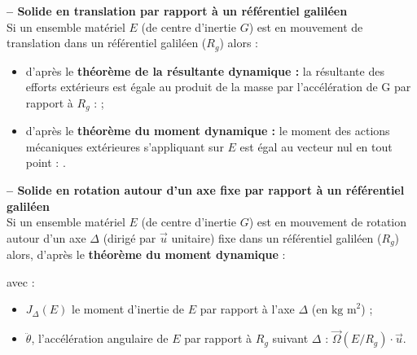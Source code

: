 
\begin{definition}\textbf{\textsf{\small -- Solide en translation par rapport à un référentiel galiléen }}~\\
Si un ensemble matériel $E$ (de centre d'inertie $G$) est en mouvement de translation dans un référentiel galiléen ($R_g$) alors : 

\begin{itemize}
\item d'après le \textbf{théorème de la résultante dynamique : } la résultante des efforts extérieurs est égale au produit de la masse par l'accélération de G par rapport à $R_g$ :
;%
\item d'après le \textbf{théorème du moment dynamique : } le moment des actions mécaniques extérieures s'appliquant sur $E$ est égal au vecteur nul en tout point :
.
\end{itemize}

\end{definition}
 



\begin{definition}\textbf{\textsf{\small -- Solide en rotation autour d'un axe fixe par rapport à un référentiel galiléen }}~\\
Si un ensemble matériel $E$ (de centre d'inertie $G$) est en mouvement de rotation autour d'un axe $\Delta$ (dirigé par $\overrightarrow{u}$ unitaire) fixe dans un référentiel galiléen ($R_g$) alors, d'après le \textbf{théorème du moment dynamique} :

 avec :
\begin{itemize}
\item  $J_{\Delta}(E)$ le moment d'inertie de $E$ par rapport à l'axe $\Delta$ (en $\text{kg  m}^2$) ;
\item $\ddot{\theta}$, l'accélération angulaire de $E$ par rapport à $R_g$ suivant $\Delta$ : $\overrightarrow{\Omega}(E/R_g)\cdot \overrightarrow{u}$.
\end{itemize}
\end{definition}

